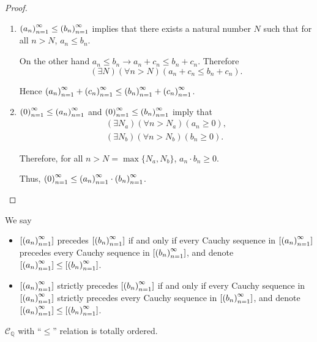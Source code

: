 \begin{proof}
    \begin{enumerate}[label={(\roman*)}]
        \item ${\left({a_{n}}\right)}^{\infty}_{n=1}\le{\left({b_{n}}\right)}^{\infty}_{n=1}$ implies that there exists a natural number $N$ such that for all $n > N$, $a_{n}\le b_{n}$.

              On the other hand $a_{n}\le b_{n}\rightarrow a_{n} + c_{n}\le b_{n} + c_{n}$. Therefore
              \[
                  (\exists N)(\forall n > N)(a_{n} + c_{n}\le b_{n} + c_{n}).
              \]

              Hence ${\left({a_{n}}\right)}^{\infty}_{n=1} + {\left({c_{n}}\right)}^{\infty}_{n=1}\le{\left({b_{n}}\right)}^{\infty}_{n=1} + {\left({c_{n}}\right)}^{\infty}_{n=1}$.
        \item ${\left({0}\right)}^{\infty}_{n=1}\le{\left({a_{n}}\right)}^{\infty}_{n=1}$ and ${\left({0}\right)}^{\infty}_{n=1}\le{\left({b_{n}}\right)}^{\infty}_{n=1}$ imply that
              \[
                  \begin{split}
                      (\exists N_{a})(\forall n > N_{a})(a_{n}\ge 0), \\
                      (\exists N_{b})(\forall n > N_{b})(b_{n}\ge 0).
                  \end{split}
              \]

              Therefore, for all $n > N = \max\{ N_{a}, N_{b} \}$, $a_{n}\cdot b_{n}\ge 0$.

              Thus, ${\left({0}\right)}^{\infty}_{n=1}\le{\left({a_{n}}\right)}^{\infty}_{n=1}\cdot{\left({b_{n}}\right)}^{\infty}_{n=1}$.
    \end{enumerate}
\end{proof}

\begin{definition}
    We say
    \begin{itemize}
        \item $\left[{{\left({a_{n}}\right)}^{\infty}_{n=1}}\right]$ precedes $\left[{{\left({b_{n}}\right)}^{\infty}_{n=1}}\right]$ if and only if every Cauchy sequence in $\left[{{\left({a_{n}}\right)}^{\infty}_{n=1}}\right]$ precedes every Cauchy sequence in $\left[{{\left({b_{n}}\right)}^{\infty}_{n=1}}\right]$, and denote $\left[{{\left({a_{n}}\right)}^{\infty}_{n=1}}\right]\le\left[{{\left({b_{n}}\right)}^{\infty}_{n=1}}\right]$.
        \item $\left[{{\left({a_{n}}\right)}^{\infty}_{n=1}}\right]$ strictly precedes $\left[{{\left({b_{n}}\right)}^{\infty}_{n=1}}\right]$ if and only if every Cauchy sequence in $\left[{{\left({a_{n}}\right)}^{\infty}_{n=1}}\right]$ strictly precedes every Cauchy sequence in $\left[{{\left({b_{n}}\right)}^{\infty}_{n=1}}\right]$, and denote $\left[{{\left({a_{n}}\right)}^{\infty}_{n=1}}\right]\le\left[{{\left({b_{n}}\right)}^{\infty}_{n=1}}\right]$.
    \end{itemize}
\end{definition}

\begin{theorem}
    $\mathscr{C}_{\mathbb{Q}}$ with ``$\le$'' relation is totally ordered.
\end{theorem}

